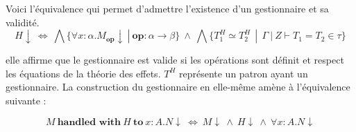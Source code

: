 

Voici l'équivalence qui permet d'admettre l'existence d'un gestionnaire et sa validité.
	\[H\downarrow~\Leftrightarrow~\bigwedge\{\forall x:\alpha.M_\textbf{op}\downarrow~|~\textbf{op}: \alpha \rightarrow \beta\}~\land~\bigwedge\{T_1^H \simeq T_2^H~~|~~\Gamma~|~Z \vdash T_1 = T_2 \in \tau\}\]

elle affirme que le gestionnaire est valide si les opérations sont définit et respect les équations de la théorie des effets. $T^H$ représente un patron ayant un gestionnaire. La construction du gestionnaire en elle-même amène à l'équivalence suivante :

	\[M~\textbf{handled~with}~H~\textbf{to}~x:A.N\downarrow~\Leftrightarrow~ M\downarrow~\land~H\downarrow~\land~\forall x:A.N\downarrow\]
 


